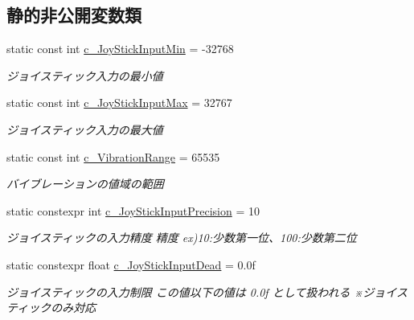 \subsection*{静的非公開変数類}
\begin{DoxyCompactItemize}
\item 
static const int \hyperlink{class_game_pad_a4ea8677f13a2189c22b54392dc9bfbec}{c\+\_\+\+Joy\+Stick\+Input\+Min} = -\/32768\hypertarget{class_game_pad_a4ea8677f13a2189c22b54392dc9bfbec}{}\label{class_game_pad_a4ea8677f13a2189c22b54392dc9bfbec}

\begin{DoxyCompactList}\small\item\em ジョイスティック入力の最小値 \end{DoxyCompactList}\item 
static const int \hyperlink{class_game_pad_aa26a42bed63156f9d897ffaef1c02349}{c\+\_\+\+Joy\+Stick\+Input\+Max} = 32767\hypertarget{class_game_pad_aa26a42bed63156f9d897ffaef1c02349}{}\label{class_game_pad_aa26a42bed63156f9d897ffaef1c02349}

\begin{DoxyCompactList}\small\item\em ジョイスティック入力の最大値 \end{DoxyCompactList}\item 
static const int \hyperlink{class_game_pad_a59b74191541375522620e4f02263413b}{c\+\_\+\+Vibration\+Range} = 65535
\begin{DoxyCompactList}\small\item\em バイブレーションの値域の範囲 \end{DoxyCompactList}\item 
static constexpr int \hyperlink{class_game_pad_aeca0e469e78b7097df11a729b9de334d}{c\+\_\+\+Joy\+Stick\+Input\+Precision} = 10\hypertarget{class_game_pad_aeca0e469e78b7097df11a729b9de334d}{}\label{class_game_pad_aeca0e469e78b7097df11a729b9de334d}

\begin{DoxyCompactList}\small\item\em ジョイスティックの入力精度  精度 ex)10\+:少数第一位、100\+:少数第二位 \end{DoxyCompactList}\item 
static constexpr float \hyperlink{class_game_pad_a438bd757d10dfa768d8145cf04d52ec2}{c\+\_\+\+Joy\+Stick\+Input\+Dead} = 0.\+0f\hypertarget{class_game_pad_a438bd757d10dfa768d8145cf04d52ec2}{}\label{class_game_pad_a438bd757d10dfa768d8145cf04d52ec2}

\begin{DoxyCompactList}\small\item\em ジョイスティックの入力制限  この値以下の値は 0.\+0f として扱われる ※ジョイスティックのみ対応 \end{DoxyCompactList}\end{DoxyCompactItemize}


